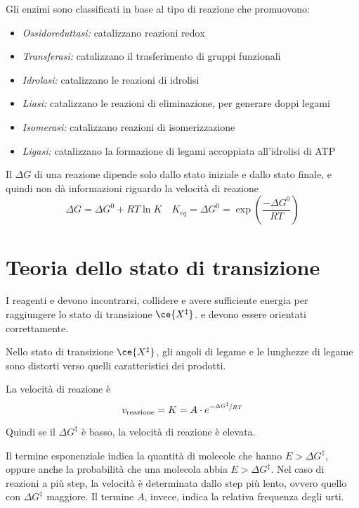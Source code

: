 Gli enzimi sono classificati in base al tipo di reazione che promuovono:
\begin{itemize}
\item \emph{Ossidoreduttasi:} catalizzano reazioni redox
\item \emph{Transferasi:} catalizzano il trasferimento di gruppi funzionali
\item \emph{Idrolasi:} catalizzano le reazioni di idrolisi
\item \emph{Liasi:} catalizzano le reazioni di eliminazione, per generare doppi legami
\item \emph{Isomerasi:} catalizzano reazioni di isomerizzazione
\item \emph{Ligasi:} catalizzano la formazione di legami accoppiata all'idrolisi di ATP
\end{itemize}

Il $\Delta G$ di una reazione dipende solo dallo stato iniziale e dallo stato finale, e quindi non dà informazioni riguardo la velocità di reazione
\[
\Delta G = \Delta G^0 + RT \ln K \quad
K_{eq} = \Delta G^0 = \exp(\frac{-\Delta G^0}{RT})
\]

\section{Teoria dello stato di transizione}
I reagenti  e  devono incontrarsi, collidere e avere sufficiente energia per raggiungere lo stato di transizione $\ce{X^{\ddagger}}$. {} e  devono essere orientati correttamente.

Nello stato di transizione $\ce{X^{\ddagger}}$, gli angoli di legame e le lunghezze di legame sono distorti verso quelli caratteristici dei prodotti.

La velocità di reazione è
\[
v_{\text{reazione}} = K = A \cdot e^{- \nicefrac{\Delta G^{\ddagger}}{RT}}
\]

Quindi se il $\Delta G^{\ddagger}$ è basso, la velocità di reazione è elevata.

Il termine esponenziale indica la quantità di molecole che hanno $E > \Delta G^{\ddagger}$, oppure anche la probabilità che una molecola abbia $E > \Delta G^{\ddagger}$. Nel caso di reazioni a più step, la velocità è determinata dallo step più lento, ovvero quello con $\Delta G^{\ddagger}$ maggiore. Il termine $A$, invece, indica la relativa frequenza degli urti.


